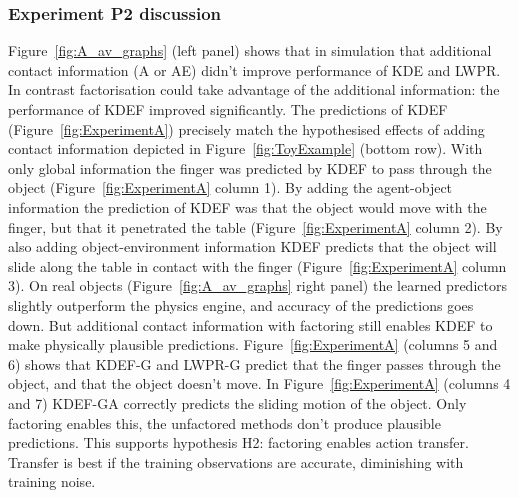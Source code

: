 \subsubsection{Experiment P2 discussion} 
Figure~\ref{fig:A_av_graphs} (left panel) shows that in simulation that additional contact information (A or AE) didn't improve performance of KDE and LWPR. In contrast factorisation could take advantage of the additional information: the performance of KDEF improved significantly. The predictions of KDEF (Figure~\ref{fig:ExperimentA}) precisely match the hypothesised
effects of adding contact information depicted in Figure~\ref{fig:ToyExample} (bottom row). With only global information the finger was predicted by KDEF to pass through the object (Figure~\ref{fig:ExperimentA} column 1). By adding the agent-object information the prediction of KDEF was that the object would move with the finger, but that it penetrated the table (Figure~\ref{fig:ExperimentA} column 2). By also adding object-environment information KDEF predicts that the object will slide along the table in contact with the finger (Figure~\ref{fig:ExperimentA} column 3). On real objects (Figure~\ref{fig:A_av_graphs} right panel) the learned predictors slightly outperform the physics engine, and accuracy of the predictions goes down. But additional contact information with factoring still enables KDEF to make physically plausible predictions. Figure~\ref{fig:ExperimentA} (columns 5 and 6) shows that KDEF-G and LWPR-G predict that the finger passes through the object, and that the object doesn't move. In Figure~\ref{fig:ExperimentA} (columns 4 and 7) KDEF-GA correctly predicts the sliding motion of the object. Only factoring enables this, the unfactored methods don't produce plausible predictions. This supports hypothesis H2: factoring enables action transfer. Transfer is best if the training observations are accurate, diminishing with training noise. 

